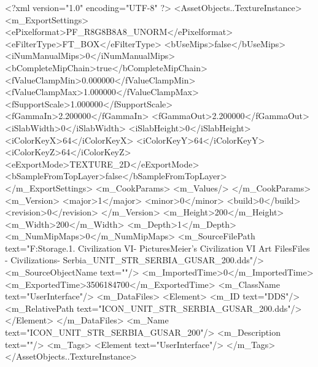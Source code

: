 <?xml version="1.0" encoding="UTF-8" ?>
<AssetObjects..TextureInstance>
	<m_ExportSettings>
		<ePixelformat>PF_R8G8B8A8_UNORM</ePixelformat>
		<eFilterType>FT_BOX</eFilterType>
		<bUseMips>false</bUseMips>
		<iNumManualMips>0</iNumManualMips>
		<bCompleteMipChain>true</bCompleteMipChain>
		<fValueClampMin>0.000000</fValueClampMin>
		<fValueClampMax>1.000000</fValueClampMax>
		<fSupportScale>1.000000</fSupportScale>
		<fGammaIn>2.200000</fGammaIn>
		<fGammaOut>2.200000</fGammaOut>
		<iSlabWidth>0</iSlabWidth>
		<iSlabHeight>0</iSlabHeight>
		<iColorKeyX>64</iColorKeyX>
		<iColorKeyY>64</iColorKeyY>
		<iColorKeyZ>64</iColorKeyZ>
		<eExportMode>TEXTURE_2D</eExportMode>
		<bSampleFromTopLayer>false</bSampleFromTopLayer>
	</m_ExportSettings>
	<m_CookParams>
		<m_Values/>
	</m_CookParams>
	<m_Version>
		<major>1</major>
		<minor>0</minor>
		<build>0</build>
		<revision>0</revision>
	</m_Version>
	<m_Height>200</m_Height>
	<m_Width>200</m_Width>
	<m_Depth>1</m_Depth>
	<m_NumMipMaps>0</m_NumMipMaps>
	<m_SourceFilePath text="F:\Mod Storage\2.1. Civilization VI\Mods\Archive - Pictures\Sid Meier's Civilization VI Art Files\Art Files - Civilizations\Civilization - Serbia\ICON_UNIT_STR_SERBIA_GUSAR_200.dds"/>
	<m_SourceObjectName text=""/>
	<m_ImportedTime>0</m_ImportedTime>
	<m_ExportedTime>3506184700</m_ExportedTime>
	<m_ClassName text="UserInterface"/>
	<m_DataFiles>
		<Element>
			<m_ID text="DDS"/>
			<m_RelativePath text="ICON_UNIT_STR_SERBIA_GUSAR_200.dds"/>
		</Element>
	</m_DataFiles>
	<m_Name text="ICON_UNIT_STR_SERBIA_GUSAR_200"/>
	<m_Description text=""/>
	<m_Tags>
		<Element text="UserInterface"/>
	</m_Tags>
</AssetObjects..TextureInstance>

